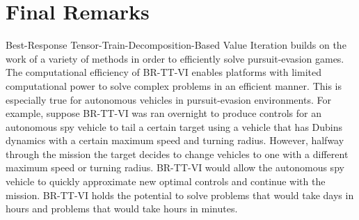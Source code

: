 \section{Final Remarks}
Best-Response Tensor-Train-Decomposition-Based Value Iteration builds on the work of a variety of methods in order to efficiently solve pursuit-evasion games. The computational efficiency of BR-TT-VI enables platforms with limited computational power to solve complex problems in an efficient manner. This is especially true for autonomous vehicles in pursuit-evasion environments. For example, suppose BR-TT-VI was ran overnight to produce controls for an autonomous spy vehicle to tail a certain target using a vehicle that has Dubins dynamics with a certain maximum speed and turning radius. However, halfway through the mission the target decides to change vehicles to one with a different maximum speed or turning radius. BR-TT-VI would allow the autonomous spy vehicle to quickly approximate new optimal controls and continue with the mission. BR-TT-VI holds the potential to solve problems that would take days in hours and problems that would take hours in minutes.       

